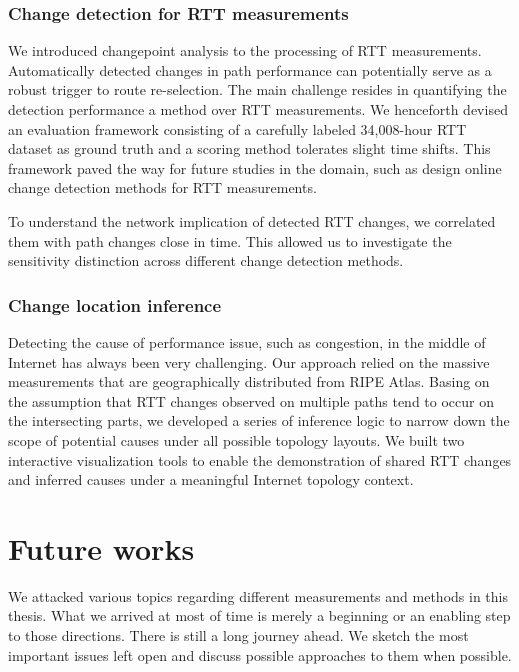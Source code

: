 \subsection{Change detection for RTT measurements}

We introduced changepoint analysis to the processing of RTT measurements.
Automatically detected changes in path performance can potentially serve as a robust trigger to route re-selection.
The main challenge resides in quantifying the detection performance a method over RTT measurements.
We henceforth devised an evaluation framework consisting of a carefully labeled 34,008-hour RTT dataset as ground truth and a scoring method tolerates slight time shifts. This framework paved the way for future studies in the domain, such as design online change detection methods for RTT measurements.

To understand the network implication of detected RTT changes, we correlated them with path changes close in time.
This allowed us to investigate the sensitivity distinction across different change detection methods.

\subsection{Change location inference}
Detecting the cause of performance issue, such as congestion, in the middle of Internet has always been very challenging. 
Our approach relied on the massive measurements that are geographically distributed from RIPE Atlas. Basing on the assumption that RTT changes observed on multiple paths tend to occur on the intersecting parts, we developed a series of inference logic to narrow down the scope of potential causes under all possible topology layouts.
We built two interactive visualization tools to enable the demonstration of shared RTT changes and inferred causes under a meaningful Internet topology context.


\chapter{Future works}
We attacked various topics regarding different measurements and methods in this thesis.
What we arrived at most of time is merely a beginning or an enabling step to those directions.
There is still a long journey ahead.
We sketch the most important issues left open and discuss possible approaches to them when possible.


